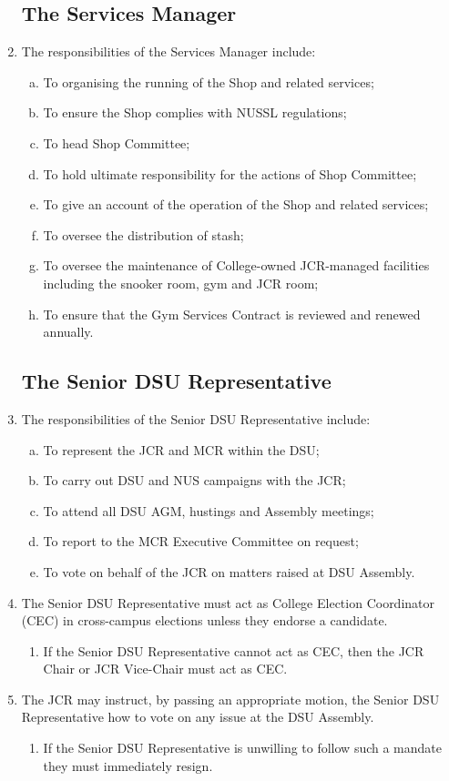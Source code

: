 \documentclass[12pt]{article}  %
\begin{document}
\begin{enumerate}
	\subsection{The Services Manager}
	\item The responsibilities of the Services Manager include:
	\begin{enumerate}[(a)]
		\item To organising the running of the Shop and related services;
		\item To ensure the Shop complies with NUSSL regulations;
		\item To head Shop Committee;
		\item To hold ultimate responsibility for the actions of Shop Committee;
		\item To give an account of the operation of the Shop and related services;
		\item To oversee the distribution of stash;
		\item To oversee the maintenance of College-owned JCR-managed facilities including the snooker room, gym and JCR room;
		\item To ensure that the Gym Services Contract is reviewed and renewed annually.
	\end{enumerate}
	\subsection{The Senior DSU Representative}
	\item The responsibilities of the Senior DSU Representative include:
	\begin{enumerate}[(a)]
		\item To represent the JCR and MCR within the DSU;
		\item To carry out DSU and NUS campaigns with the JCR;
		\item To attend all DSU AGM, hustings and Assembly meetings;
		\item To report to the MCR Executive Committee on request;
		\item To vote on behalf of the JCR on matters raised at DSU Assembly.
	\end{enumerate}
	\item The Senior DSU Representative must act as College Election Coordinator (CEC) in cross-campus elections unless they endorse a candidate.
	\begin{enumerate}
		\item If the Senior DSU Representative cannot act as CEC, then the JCR Chair or JCR Vice-Chair must act as CEC.
	\end{enumerate}
	\item The JCR may instruct, by passing an appropriate motion, the Senior DSU Representative how to vote on any issue at the DSU Assembly.
	\begin{enumerate}
		\item If the Senior DSU Representative is unwilling to follow such a mandate they must immediately resign.
	\end{enumerate}

\end{enumerate}
\end{document}
